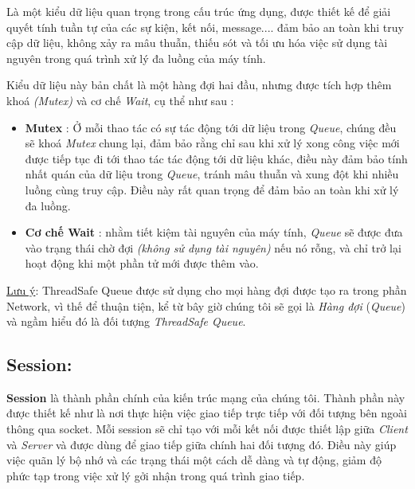 Là một kiểu dữ liệu quan trọng trong cấu trúc ứng dụng, được thiết kế để giải quyết tính tuần tự của các sự kiện, kết nối, message....  đảm bảo an toàn khi truy cập dữ liệu, không xảy ra mâu thuẫn, thiếu sót và tối ưu hóa việc sử dụng tài nguyên trong quá trình xử lý đa luồng của máy tính.

Kiểu dữ liệu này bản chất là một hàng đợi hai đầu, nhưng được tích hợp thêm khoá \textit{(Mutex)} và cơ chế \textit{Wait}, cụ thể như sau :
\begin{itemize}
	\item \textbf{Mutex} : Ở mỗi thao tác có sự tác động tới dữ liệu trong \textit{Queue}, chúng đều sẽ khoá \textit{Mutex} chung lại, đảm bảo rằng chỉ sau khi xử lý xong công việc mới được tiếp tục đi tới thao tác tác động tới dữ liệu khác, điều này đảm bảo tính nhất quán của dữ liệu trong \textit{Queue}, tránh mâu thuẫn và xung đột khi nhiều luồng cùng truy cập. Điều này rất quan trọng để đảm bảo an toàn khi xử lý đa luồng.
	\item \textbf{Cơ chế Wait} : nhằm tiết kiệm tài nguyên của máy tính, \textit{Queue} sẽ được đưa vào trạng thái chờ đợi \textit{(không sử dụng tài nguyên)} nếu nó rỗng, và chỉ trở lại hoạt động khi một phần tử mới được thêm vào.
\end{itemize}

\underline{Lưu ý}: ThreadSafe Queue được sử dụng cho mọi hàng đợi được tạo ra trong phần Network, vì thế để thuận tiện, kể từ bây giờ chúng tôi sẽ gọi là \textit{Hàng đợi} (\textit{Queue}) và ngầm hiểu đó là đối tượng \textit{ThreadSafe Queue}.

\subsection{Session: }
\textbf{Session} là thành phần chính của kiến trúc mạng của chúng tôi. Thành phần này được thiết kế như là nơi thực hiện việc giao tiếp trực tiếp với đối tượng bên ngoài thông qua socket. Mỗi session sẽ chỉ tạo với mỗi kết nối được thiết lập giữa \textit{Client} và \textit{Server} và được dùng để giao tiếp giữa chính hai đối tượng đó. Điều này giúp việc quãn lý bộ nhớ và các trạng thái một cách dễ dàng và tự động, giảm độ phức tạp trong việc xử lý gởi nhận trong quá trình giao tiếp.

